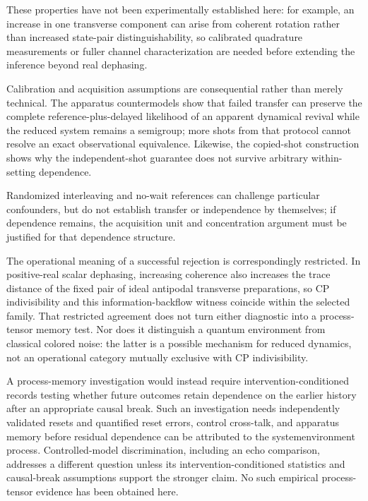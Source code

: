 \documentclass[11pt]{article}
\begin{document}
These properties have not been experimentally established here: for example, an increase in one transverse component can arise from coherent rotation rather than increased state-pair distinguishability, so calibrated quadrature measurements or fuller channel characterization are needed before extending the inference beyond real dephasing.

Calibration and acquisition assumptions are consequential rather than merely technical. The apparatus countermodels show that failed transfer can preserve the complete reference-plus-delayed likelihood of an apparent dynamical revival while the reduced system remains a semigroup; more shots from that protocol cannot resolve an exact observational equivalence. Likewise, the copied-shot construction shows why the independent-shot guarantee does not survive arbitrary within-setting dependence.

Randomized interleaving and no-wait references can challenge particular confounders, but do not establish transfer or independence by themselves; if dependence remains, the acquisition unit and concentration argument must be justified for that dependence structure.

The operational meaning of a successful rejection is correspondingly restricted. In positive-real scalar dephasing, increasing coherence also increases the trace distance of the fixed pair of ideal antipodal transverse preparations, so CP indivisibility and this information-backflow witness coincide within the selected family. That restricted agreement does not turn either diagnostic into a process-tensor memory test. Nor does it distinguish a quantum environment from classical colored noise: the latter is a possible mechanism for reduced dynamics, not an operational category mutually exclusive with CP indivisibility.

A process-memory investigation would instead require intervention-conditioned records testing whether future outcomes retain dependence on the earlier history after an appropriate causal break. Such an investigation needs independently validated resets and quantified reset errors, control cross-talk, and apparatus memory before residual dependence can be attributed to the system\textendash{}environment process. Controlled-model discrimination, including an echo comparison, addresses a different question unless its intervention-conditioned statistics and causal-break assumptions support the stronger claim. No such empirical process-tensor evidence has been obtained here.
\end{document}
